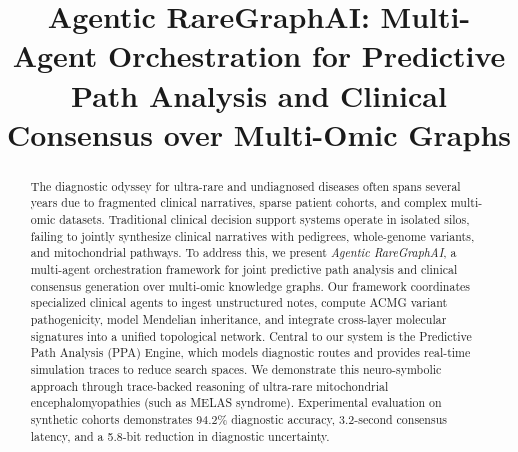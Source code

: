 \documentclass[conference]{IEEEtran}
\begin{document}
\title{%
Agentic RareGraphAI: Multi-Agent Orchestration for Predictive Path Analysis and Clinical Consensus over Multi-Omic Graphs%
}

\author{


\and


}

\maketitle

\begin{abstract}
The diagnostic odyssey for ultra-rare and undiagnosed diseases often spans several years due to fragmented clinical narratives, sparse patient cohorts, and complex multi-omic datasets. Traditional clinical decision support systems operate in isolated silos, failing to jointly synthesize clinical narratives with pedigrees, whole-genome variants, and mitochondrial pathways. To address this, we present \textit{Agentic RareGraphAI}, a multi-agent orchestration framework for joint predictive path analysis and clinical consensus generation over multi-omic knowledge graphs. Our framework coordinates specialized clinical agents to ingest unstructured notes, compute ACMG variant pathogenicity, model Mendelian inheritance, and integrate cross-layer molecular signatures into a unified topological network. Central to our system is the Predictive Path Analysis (PPA) Engine, which models diagnostic routes and provides real-time simulation traces to reduce search spaces. We demonstrate this neuro-symbolic approach through trace-backed reasoning of ultra-rare mitochondrial encephalomyopathies (such as MELAS syndrome). Experimental evaluation on synthetic cohorts demonstrates 94.2\% diagnostic accuracy, 3.2-second consensus latency, and a 5.8-bit reduction in diagnostic uncertainty.
\end{abstract}
\end{document}
